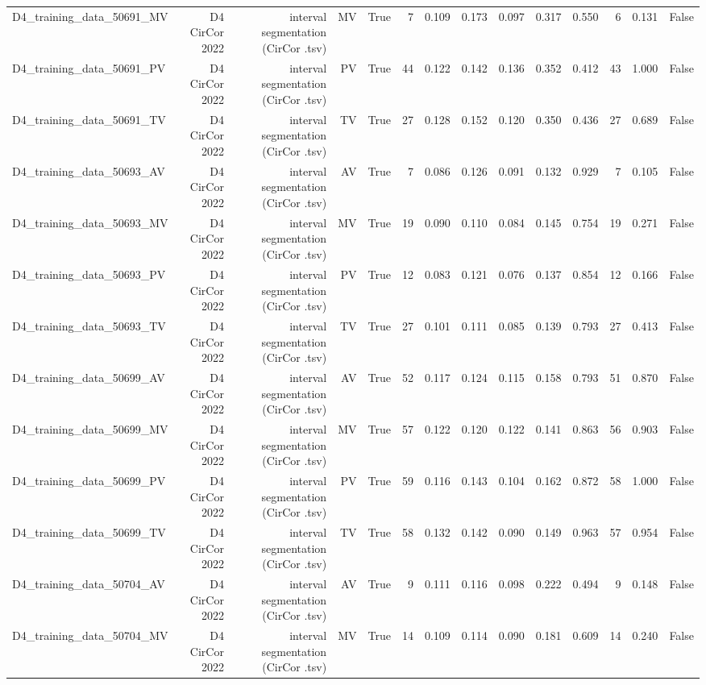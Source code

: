 \begin{table}[htbp]
\begin{tabular}{lrrrrrrrrrrrrr}
    D4\_training\_data\_50691\_MV & D4 CirCor 2022 & interval segmentation (CirCor .tsv) & MV & True & 7 & 0.109 & 0.173 & 0.097 & 0.317 & 0.550 & 6 & 0.131 & False \\
    D4\_training\_data\_50691\_PV & D4 CirCor 2022 & interval segmentation (CirCor .tsv) & PV & True & 44 & 0.122 & 0.142 & 0.136 & 0.352 & 0.412 & 43 & 1.000 & False \\
    D4\_training\_data\_50691\_TV & D4 CirCor 2022 & interval segmentation (CirCor .tsv) & TV & True & 27 & 0.128 & 0.152 & 0.120 & 0.350 & 0.436 & 27 & 0.689 & False \\
    D4\_training\_data\_50693\_AV & D4 CirCor 2022 & interval segmentation (CirCor .tsv) & AV & True & 7 & 0.086 & 0.126 & 0.091 & 0.132 & 0.929 & 7 & 0.105 & False \\
    D4\_training\_data\_50693\_MV & D4 CirCor 2022 & interval segmentation (CirCor .tsv) & MV & True & 19 & 0.090 & 0.110 & 0.084 & 0.145 & 0.754 & 19 & 0.271 & False \\
    D4\_training\_data\_50693\_PV & D4 CirCor 2022 & interval segmentation (CirCor .tsv) & PV & True & 12 & 0.083 & 0.121 & 0.076 & 0.137 & 0.854 & 12 & 0.166 & False \\
    D4\_training\_data\_50693\_TV & D4 CirCor 2022 & interval segmentation (CirCor .tsv) & TV & True & 27 & 0.101 & 0.111 & 0.085 & 0.139 & 0.793 & 27 & 0.413 & False \\
    D4\_training\_data\_50699\_AV & D4 CirCor 2022 & interval segmentation (CirCor .tsv) & AV & True & 52 & 0.117 & 0.124 & 0.115 & 0.158 & 0.793 & 51 & 0.870 & False \\
    D4\_training\_data\_50699\_MV & D4 CirCor 2022 & interval segmentation (CirCor .tsv) & MV & True & 57 & 0.122 & 0.120 & 0.122 & 0.141 & 0.863 & 56 & 0.903 & False \\
    D4\_training\_data\_50699\_PV & D4 CirCor 2022 & interval segmentation (CirCor .tsv) & PV & True & 59 & 0.116 & 0.143 & 0.104 & 0.162 & 0.872 & 58 & 1.000 & False \\
    D4\_training\_data\_50699\_TV & D4 CirCor 2022 & interval segmentation (CirCor .tsv) & TV & True & 58 & 0.132 & 0.142 & 0.090 & 0.149 & 0.963 & 57 & 0.954 & False \\
    D4\_training\_data\_50704\_AV & D4 CirCor 2022 & interval segmentation (CirCor .tsv) & AV & True & 9 & 0.111 & 0.116 & 0.098 & 0.222 & 0.494 & 9 & 0.148 & False \\
    D4\_training\_data\_50704\_MV & D4 CirCor 2022 & interval segmentation (CirCor .tsv) & MV & True & 14 & 0.109 & 0.114 & 0.090 & 0.181 & 0.609 & 14 & 0.240 & False \\

\end{tabular}
\end{table}
